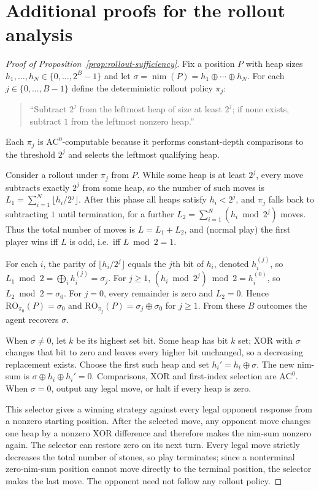 \documentclass[twoside,11pt]{article}
\newcommand{\AC}{\mathrm{AC}}
\numberwithin{theorem}{section}
\numberwithin{equation}{section}
\begin{document}
\section{Additional proofs for the rollout analysis}
\label{app:rollout-proofs}

\begin{proof}[Proof of Proposition~\ref{prop:rollout-sufficiency}]
Fix a position $P$ with heap sizes $h_1,\dots,h_N\in\{0,\dots,2^B-1\}$ and let $\sigma=\operatorname{nim}(P)=h_1\oplus\cdots\oplus h_N$.
For each $j\in\{0,\dots,B-1\}$ define the deterministic rollout policy $\pi_j$:
\begin{quote}
``Subtract $2^j$ from the leftmost heap of size at least $2^j$; if none exists, subtract $1$ from the leftmost nonzero heap.''
\end{quote}
Each $\pi_j$ is $\AC^0$-computable because it performs constant-depth comparisons to the threshold $2^j$ and selects the leftmost qualifying heap.

Consider a rollout under $\pi_j$ from $P$.
While some heap is at least $2^j$, every move subtracts exactly $2^j$ from some heap, so the number of such moves is
$L_1=\sum_{i=1}^N \lfloor h_i/2^j\rfloor$.
After this phase all heaps satisfy $h_i<2^j$, and $\pi_j$ falls back to subtracting $1$ until termination, for a further
$L_2=\sum_{i=1}^N (h_i\bmod 2^j)$ moves.
Thus the total number of moves is $L=L_1+L_2$, and (normal play) the first player wins iff $L$ is odd, i.e.\ iff $L\bmod 2=1$.

For each $i$, the parity of $\lfloor h_i/2^j\rfloor$ equals the $j$th bit of $h_i$, denoted $h_i^{(j)}$, so
$L_1\bmod 2=\bigoplus_i h_i^{(j)}=\sigma_j$.
For $j\ge1$, $(h_i\bmod 2^j)\bmod2=h_i^{(0)}$, so $L_2\bmod2=\sigma_0$. For $j=0$, every remainder is zero and $L_2=0$.
Hence
$\mathrm{RO}_{\pi_0}(P)=\sigma_0$ and $\mathrm{RO}_{\pi_j}(P)=\sigma_j\oplus\sigma_0$ for $j\ge 1$.
From these $B$ outcomes the agent recovers $\sigma$.

When $\sigma\ne0$, let $k$ be its highest set bit. Some heap has bit $k$ set; XOR with $\sigma$ changes that bit to zero and leaves every higher bit unchanged, so a decreasing replacement exists. Choose the first such heap and set $h_i'=h_i\oplus\sigma$. The new nim-sum is $\sigma\oplus h_i\oplus h_i'=0$. Comparisons, XOR and first-index selection are $\AC^0$. When $\sigma=0$, output any legal move, or halt if every heap is zero.

This selector gives a winning strategy against every legal opponent response from a nonzero starting position. After the selected move, any opponent move changes one heap by a nonzero XOR difference and therefore makes the nim-sum nonzero again. The selector can restore zero on its next turn. Every legal move strictly decreases the total number of stones, so play terminates; since a nonterminal zero-nim-sum position cannot move directly to the terminal position, the selector makes the last move. The opponent need not follow any rollout policy.


\end{proof}
\end{document}
